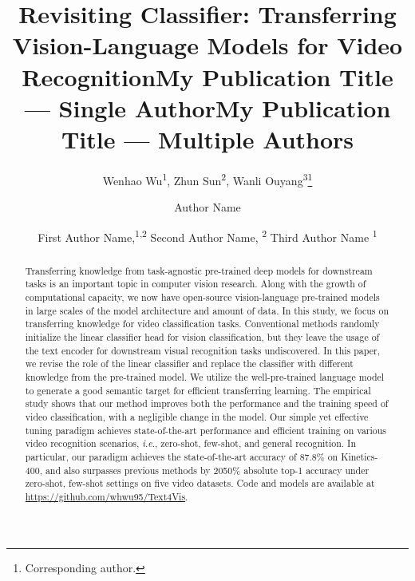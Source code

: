 \documentclass[letterpaper]{article} \usepackage{aaai23}  \usepackage{times}  \usepackage{helvet}  \usepackage{courier}  \usepackage[hyphens]{url}  \usepackage{graphicx} \urlstyle{rm} \def\UrlFont{\rm}  \usepackage{natbib}  \usepackage{caption} \frenchspacing  \setlength{\pdfpagewidth}{8.5in}  \setlength{\pdfpageheight}{11in}  \usepackage{algorithm}
\title{Revisiting Classifier: Transferring Vision-Language Models for Video Recognition}
\author{Wenhao Wu\textsuperscript{\rm 1},
Zhun Sun\textsuperscript{\rm2},
Wanli Ouyang\textsuperscript{\rm3}\thanks{Corresponding author.}
}
\title{My Publication Title --- Single Author}
\author {
    Author Name
}
\title{My Publication Title --- Multiple Authors}
\author {
First Author Name,\textsuperscript{\rm 1,\rm 2}
    Second Author Name, \textsuperscript{\rm 2}
    Third Author Name \textsuperscript{\rm 1}
}
\newcommand{\ie}{\textit{i}.\textit{e}.}
\begin{document}
\maketitle
\begin{abstract}

Transferring knowledge from task-agnostic pre-trained deep models for downstream tasks is an important topic in computer vision research.
Along with the growth of computational capacity, we now have open-source vision-language pre-trained models in large scales of the model architecture and amount of data.
In this study, we focus on transferring knowledge for video classification tasks.
Conventional methods randomly initialize the linear classifier head for vision classification, but they leave the usage of the text encoder for downstream visual recognition tasks undiscovered. In this paper, we revise the role of the linear classifier and replace the classifier with different knowledge from the pre-trained model. We utilize the well-pre-trained language model to generate a good semantic target for efficient transferring learning.
The empirical study shows that our method improves both the performance and the training speed of video classification, with a negligible change in the model.
Our simple yet effective tuning paradigm achieves state-of-the-art performance and efficient training on various video recognition scenarios, \ie, zero-shot, few-shot, and general recognition.
In particular, our paradigm achieves the state-of-the-art accuracy of 87.8\% on Kinetics-400, and also surpasses previous methods by 2050\% absolute top-1 accuracy under zero-shot, few-shot settings on five video datasets.
Code and models are available at \url{https://github.com/whwu95/Text4Vis}.
\end{abstract} 
\end{document}
